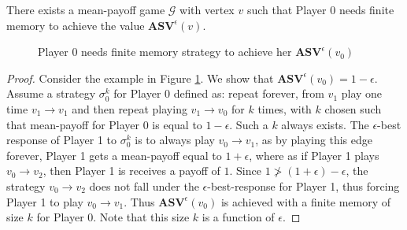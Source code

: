 \begin{theorem}
\label{ThmExNeedFinMem}
There exists a mean-payoff game $\mathcal{G}$ with vertex $v$ such that Player $0$ needs finite memory to achieve the value $\mathbf{ASV}^{\epsilon}(v)$.
\end{theorem}
\begin{figure}
    \centering
    \caption{Player $0$ needs finite memory strategy to achieve her $\mathbf{ASV}^{\epsilon}(v_0)$}
    \label{fig:finite_strategy_response}
\end{figure}
\begin{proof}
Consider the example in Figure \ref{fig:finite_strategy_response}. We show that $\mathbf{ASV}^{\epsilon}(v_0) = 1 - \epsilon$. Assume a strategy $\sigma_0^{k}$ for Player 0 defined as: repeat forever, from $v_1$ play one time $v_1 \to v_1$ and then repeat playing $v_1 \to v_0$ for $k$ times, with $k$ chosen such that mean-payoff for Player 0 is equal to $1 - \epsilon$. Such a $k$ always exists. The $\epsilon$-best response of Player 1 to $\sigma_0^{k}$ is to always play $v_0 \to v_1$, as by playing this edge forever, Player 1 gets a mean-payoff equal to $1+\epsilon$, where as if Player 1 plays $v_0 \to v_2$, then Player 1 is receives a payoff of $1$. Since $1 \ngtr (1 + \epsilon) - \epsilon$, the strategy $v_0 \to v_2$ does not fall under the $\epsilon$-best-response for Player 1, thus forcing Player 1 to play $v_0 \to v_1$. Thus $\mathbf{ASV}^{\epsilon}(v_0)$ is achieved with a finite memory of size $k$ for Player 0. Note that this size $k$ is a function of $\epsilon$.
\end{proof}